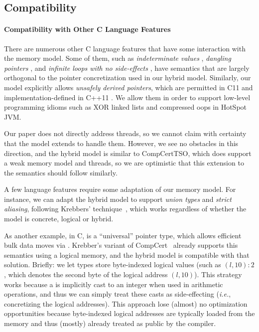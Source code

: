\subsection{Compatibility}

\paragraph{Compatibility with Other C Language Features}

There are numerous other C language features that have some
interaction with the memory model.  Some of them, such as
\textit{indeterminate values} \cite[\S3.19.2p1]{iso2011iec}, \textit{dangling pointers}
\cite[\S6.2.4p2]{iso2011iec}, and \textit{infinite loops with no side-effects}
\cite[\S6.8.5p6]{iso2011iec}, have semantics that are largely orthogonal to
the pointer concretization used in our hybrid model.
Similarly, our model explicitly allows \textit{unsafely derived pointers},
which are permitted in C11 and implementation-defined in C++11 \cite[\S3.7.4p4]{iso2011iec}. 
We allow them in order to support low-level programming idioms such as XOR linked lists and
compressed oops in HotSpot JVM.

Our paper does not directly address threads, so we cannot claim with
certainty that the model extends to handle them.  However, we see no
obstacles in this direction, and the hybrid model is similar
to CompCertTSO, which does support a weak memory model and threads, so
we are optimistic that this extension to the semantics should follow similarly.

A few language features require some adaptation of our memory model.
For instance, we can adapt the hybrid model to support
\textit{union types} and \textit{strict aliasing}, following Krebbers'
technique~\cite{krebbers2013aliasing}, which works regardless of
whether the model is concrete, logical or hybrid.

As another example, in C,  is a ``universal'' pointer type, which allows
efficient bulk data moves via .  Krebber's variant of
CompCert~\cite{krebbers2014formal} already supports this semantics using a logical
memory, and the hybrid model is compatible with that solution.
Briefly: we let  types store byte-indexed logical values
(such as $(l,10)\!:\!2$, which denotes the second byte of the logical
address $(l,10)$). This strategy works because a  is
implicitly cast to an integer when used in arithmetic operations,
and thus we
can simply treat these casts as side-effecting (\textit{i.e.},
concretizing the logical addresses).  This approach lose (almost) no
optimization opportunities because byte-indexed logical addresses
are typically loaded from the memory and 
thus (mostly) already treated as public by the compiler.



